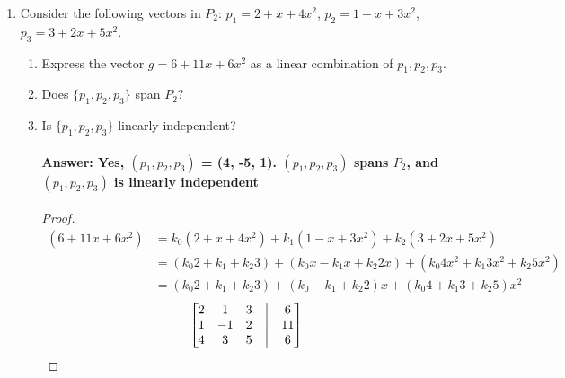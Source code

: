 \documentclass[12pt]{article}
\begin{document}
\begin{enumerate}
\begin{enumerate}
\begin{proof}
                                    so $W$ is a subspace of $M_{nn}$.
                            \end{proof}
              \end{enumerate}

        \item Consider the following vectors in $P_2$: $p_1 = 2 + x + 4x^2$, $p_2 = 1 - x + 3x^2$, $p_3 = 3 + 2x + 5x^2$.
              \begin{enumerate}
                      \item Express the vector $g = 6 + 11x + 6x^2$ as a linear combination of $p_1,p_2,p_3$.
                      \item Does $\{p_1,p_2,p_3\}$ span $P_2$?
                      \item Is $\{p_1,p_2,p_3\}$ linearly independent?
                            \paragraph{Answer: Yes, $(p_1,p_2,p_3)$ = (4, -5, 1).
                                    $(p_1,p_2,p_3)$ spans $P_2$,
                                    and $(p_1,p_2,p_3)$ is linearly independent}
                            \begin{proof}
                                    \begin{align*}
                                            (6 + 11x + 6x^2) & =  k_{0}(2 + x + 4x^2) +  k_{1}(1 - x + 3x^2) +  k_{2}(3 + 2x + 5x^2)                                \\
                                                             & =  (k_{0}2 + k_{1} + k_{2}3)  +  (k_{0}x - k_{1}x + k_{2}2x)  +  (k_{0}4x^2 + k_{1}3x^2 + k_{2}5x^2) \\
                                                             & =  (k_{0}2 + k_{1} + k_{2}3)  +  (k_{0} - k_{1} + k_{2}2)x    +  (k_{0}4 + k_{1}3 + k_{2}5)x^2
                                    \end{align*}
                                    \begin{align*}
                                            \begin{bmatrix}
                                                    2 & 1  & 3 & \bigm| & 6  \\
                                                    1 & -1 & 2 & \bigm| & 11 \\
                                                    4 & 3  & 5 & \bigm| & 6  \\

\end{bmatrix}
\end{align*}
\end{proof}
\end{enumerate}
\end{enumerate}
\end{document}
